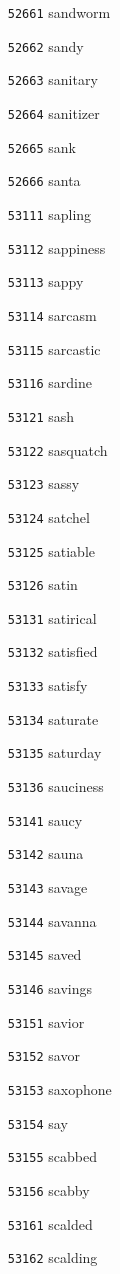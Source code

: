 \documentclass[twoside,11pt]{article}
\begin{document}
\begin{multicols}{5}
\begin{enumerate}
\item[\texttt{52661}] sandworm
\item[\texttt{52662}] sandy
\item[\texttt{52663}] sanitary
\item[\texttt{52664}] sanitizer
\item[\texttt{52665}] sank
\item[\texttt{52666}] santa
\item[\texttt{53111}] sapling
\item[\texttt{53112}] sappiness
\item[\texttt{53113}] sappy
\item[\texttt{53114}] sarcasm
\item[\texttt{53115}] sarcastic
\item[\texttt{53116}] sardine
\item[\texttt{53121}] sash
\item[\texttt{53122}] sasquatch
\item[\texttt{53123}] sassy
\item[\texttt{53124}] satchel
\item[\texttt{53125}] satiable
\item[\texttt{53126}] satin
\item[\texttt{53131}] satirical
\item[\texttt{53132}] satisfied
\item[\texttt{53133}] satisfy
\item[\texttt{53134}] saturate
\item[\texttt{53135}] saturday
\item[\texttt{53136}] sauciness
\item[\texttt{53141}] saucy
\item[\texttt{53142}] sauna
\item[\texttt{53143}] savage
\item[\texttt{53144}] savanna
\item[\texttt{53145}] saved
\item[\texttt{53146}] savings
\item[\texttt{53151}] savior
\item[\texttt{53152}] savor
\item[\texttt{53153}] saxophone
\item[\texttt{53154}] say
\item[\texttt{53155}] scabbed
\item[\texttt{53156}] scabby
\item[\texttt{53161}] scalded
\item[\texttt{53162}] scalding

\end{enumerate}
\end{multicols}
\end{document}
